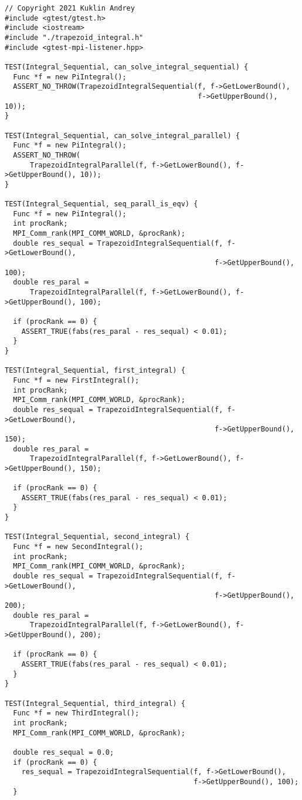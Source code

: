\documentclass{report}
\begin{document}
\begin{lstlisting}
// Copyright 2021 Kuklin Andrey
#include <gtest/gtest.h>
#include <iostream>
#include "./trapezoid_integral.h"
#include <gtest-mpi-listener.hpp>

TEST(Integral_Sequential, can_solve_integral_sequential) {
  Func *f = new PiIntegral();
  ASSERT_NO_THROW(TrapezoidIntegralSequential(f, f->GetLowerBound(),
                                              f->GetUpperBound(), 10));
}

TEST(Integral_Sequential, can_solve_integral_parallel) {
  Func *f = new PiIntegral();
  ASSERT_NO_THROW(
      TrapezoidIntegralParallel(f, f->GetLowerBound(), f->GetUpperBound(), 10));
}

TEST(Integral_Sequential, seq_parall_is_eqv) {
  Func *f = new PiIntegral();
  int procRank;
  MPI_Comm_rank(MPI_COMM_WORLD, &procRank);
  double res_sequal = TrapezoidIntegralSequential(f, f->GetLowerBound(),
                                                  f->GetUpperBound(), 100);
  double res_paral =
      TrapezoidIntegralParallel(f, f->GetLowerBound(), f->GetUpperBound(), 100);

  if (procRank == 0) {
    ASSERT_TRUE(fabs(res_paral - res_sequal) < 0.01);
  }
}

TEST(Integral_Sequential, first_integral) {
  Func *f = new FirstIntegral();
  int procRank;
  MPI_Comm_rank(MPI_COMM_WORLD, &procRank);
  double res_sequal = TrapezoidIntegralSequential(f, f->GetLowerBound(),
                                                  f->GetUpperBound(), 150);
  double res_paral =
      TrapezoidIntegralParallel(f, f->GetLowerBound(), f->GetUpperBound(), 150);

  if (procRank == 0) {
    ASSERT_TRUE(fabs(res_paral - res_sequal) < 0.01);
  }
}

TEST(Integral_Sequential, second_integral) {
  Func *f = new SecondIntegral();
  int procRank;
  MPI_Comm_rank(MPI_COMM_WORLD, &procRank);
  double res_sequal = TrapezoidIntegralSequential(f, f->GetLowerBound(),
                                                  f->GetUpperBound(), 200);
  double res_paral =
      TrapezoidIntegralParallel(f, f->GetLowerBound(), f->GetUpperBound(), 200);

  if (procRank == 0) {
    ASSERT_TRUE(fabs(res_paral - res_sequal) < 0.01);
  }
}

TEST(Integral_Sequential, third_integral) {
  Func *f = new ThirdIntegral();
  int procRank;
  MPI_Comm_rank(MPI_COMM_WORLD, &procRank);

  double res_sequal = 0.0;
  if (procRank == 0) {
    res_sequal = TrapezoidIntegralSequential(f, f->GetLowerBound(),
                                             f->GetUpperBound(), 100);
  }


\end{lstlisting}
\end{document}
